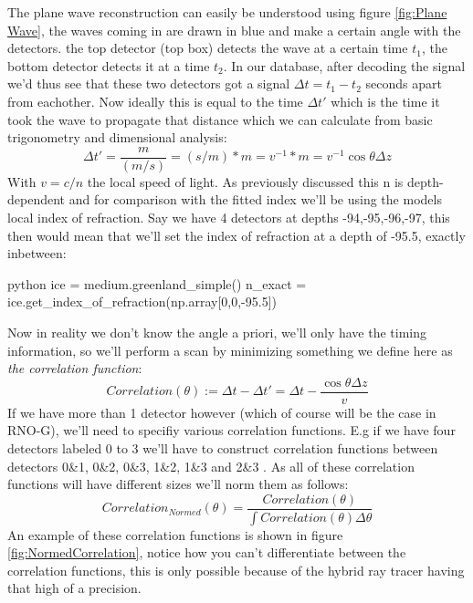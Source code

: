 \documentclass[11pt,a4paper,faculty=we,language=en,doctype=report]{cls/ugent-doc}
\begin{document}
The plane wave reconstruction can easily be understood using figure
\ref{fig:Plane Wave}, the waves coming in are drawn in blue and
make a certain angle with the detectors. the top detector (top box)
detects the wave at a certain time $t_1$, the bottom detector
detects it at a time $t_2$. In our database, after decoding the
signal we'd thus see that these two detectors got a signal $\Delta t
= t_1 - t_2$ seconds apart from eachother. Now ideally this is
equal to the time $\Delta t'$ which is the time it took the wave
to propagate that distance which we can calculate from 
basic trigonometry and dimensional analysis:
\begin{equation}
	\Delta t' = \frac{m}{(m/s)} = (s/m)*m = v^{-1} * m = v^{-1} \cos\theta \Delta z
\end{equation}
With $v = c/n$ the local speed of light. As previously discussed this n is
depth-dependent and for comparison with the fitted index we'll be using the
models local index of refraction. Say we have 4 detectors at depths -94,-95,-96,-97,
this then would mean that we'll set the index of refraction at a depth of -95.5, 
exactly inbetween:
\begin{mintedbox}{python}
ice = medium.greenland_simple()
n_exact = ice.get_index_of_refraction(np.array[0,0,-95.5])
\end{mintedbox}
Now in reality we don't know the angle a priori, we'll only have the timing
information, so we'll perform a scan by minimizing something we define here as 
\textit{the correlation function}:
\begin{equation}
	Correlation(\theta) := \Delta t - \Delta t' = \Delta t
	- \frac{\cos\theta \Delta z}{v}
  \label{eqn:PlaneWave}
\end{equation}
If we have more than 1 detector however (which of course will be the case in RNO-G),
we'll need to specifiy various correlation functions.
E.g if we have four detectors labeled 0 to 3 we'll have to construct
correlation functions between detectors 0\&1, 0\&2, 0\&3, 1\&2, 1\&3 and 2\&3 .
As all of these correlation functions will have different
sizes we'll norm them as follows:
\begin{equation}
	Correlation_{Normed}(\theta) =
	\frac{Correlation(\theta)}{\int Correlation(\theta)\Delta
	\theta}
\end{equation}
An example of these correlation functions is shown in figure \ref{fig:NormedCorrelation}, 
notice how you can't differentiate between the correlation functions, this is only possible
because of the hybrid ray tracer having that high of a precision.
\end{document}
